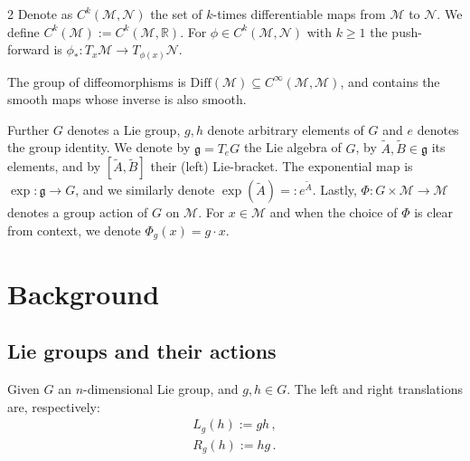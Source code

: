 \documentclass{article}
\newcommand{\M}{\mathcal{M}}                                %
\newcommand{\g}{\mathfrak{g}}                               %
\newcommand{\R}{\mathbb{R}}                                 %
\newcommand{\state}{x}
\newcommand{\Diff}{\mathrm{Diff}}
\begin{document}
\begin{multicols}{2}
Denote as $C^k(\M,\mathcal{N})$ the set of $k$-times differentiable maps from $\M$ to $\mathcal{N}$. We define $C^k(\M) := C^k(\M,\R)$. For $\phi \in C^k(\M,\mathcal{N})$ with $k\geq 1$ the push-forward is $\phi_*: T_\state\mathcal{M} \rightarrow T_{\phi(\state)}\mathcal{N}$. 

The group of diffeomorphisms is $\Diff(\M) \subseteq C^\infty(\M,\M)$, and contains the smooth maps whose inverse is also smooth. %

Further $G$ denotes a Lie group, $g,h$ denote arbitrary elements of $G$ and $e$ denotes the group identity. %
We denote by $\g = T_e G$ the Lie algebra of $G$, by $\widetilde{A},\widetilde{B} \in \g$ its elements, and by $[\widetilde{A},\widetilde{B}]$ their (left) Lie-bracket. 
The exponential map is $\exp:\g\rightarrow G$, and we similarly denote $\exp(\widetilde{A}) =: e^{\widetilde{A}}$. %
Lastly, $\Phi:G\times \M \rightarrow \M$ denotes a group action of $G$ on $\M$. For $\state\in\M$ and when the choice of $\Phi$ is clear from context, we denote $\Phi_g(\state) = g\cdot \state$. 





\section{Background}\label{sec:background}

\subsection{Lie groups and their actions} 
Given $G$ an $n$-dimensional Lie group, and $g,h \in G$. The left and right translations are, respectively: 
\begin{align}
    L_g(h) := gh \,,\\
    R_g(h) := hg \,.
\end{align}


\end{multicols}
\end{document}

